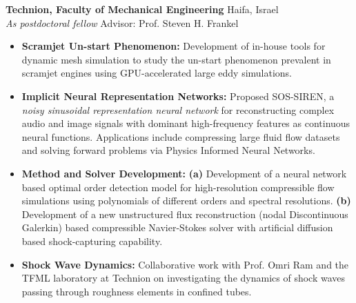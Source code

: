\noindent \textbf{Technion, Faculty of Mechanical Engineering} \hfill Haifa, Israel\\
\noindent \textit{As postdoctoral fellow} \hfill Advisor: Prof. Steven H. Frankel \\[-5mm]

\begin{itemize}[itemsep=0pt, topsep=5pt, label=]
    \item \textbf{Scramjet Un-start Phenomenon:} Development of in-house tools for dynamic mesh simulation to study the un-start phenomenon prevalent in scramjet engines using GPU-accelerated large eddy simulations.
\end{itemize}
\begin{itemize}[itemsep=0pt, topsep=0pt, label=]
    \item \textbf{Implicit Neural Representation Networks:} Proposed SOS-SIREN, a \textit{noisy sinusoidal representation neural network} for reconstructing complex audio and image signals with dominant high-frequency features as continuous neural functions. Applications include compressing large fluid flow datasets and solving forward problems via Physics Informed Neural Networks.
\end{itemize}
\begin{itemize}[itemsep=0pt, topsep=0pt, label=]
    \item \textbf{Method and Solver Development:} \textbf{(a)} Development of a neural network based optimal order detection model for high-resolution compressible flow simulations using polynomials of different orders and spectral resolutions. \textbf{(b)} Development of a new unstructured flux reconstruction (nodal Discontinuous Galerkin) based compressible Navier-Stokes solver with artificial diffusion based shock-capturing capability.
\end{itemize}
\begin{itemize}[itemsep=0pt, topsep=0pt, label=]
    \item \textbf{Shock Wave Dynamics:} Collaborative work with Prof. Omri Ram and the TFML laboratory at Technion on investigating the dynamics of shock waves passing through roughness elements in confined tubes. \\
\end{itemize}

